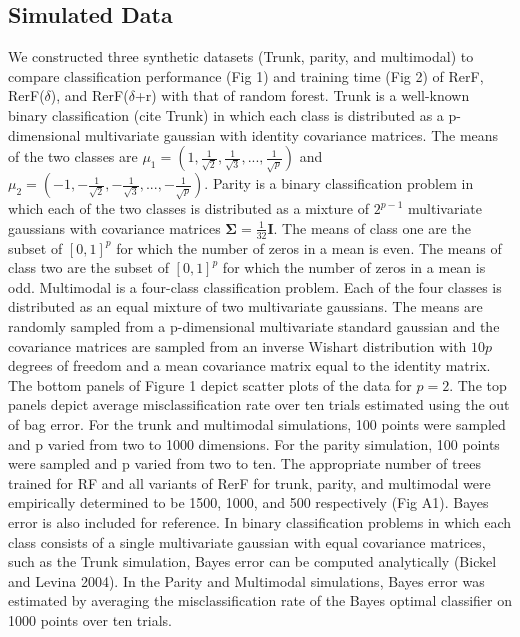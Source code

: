 \documentclass{article} %
\newcommand{\jovo}[1]{{\color{magenta}{\it jovo says: #1}}}
\begin{document}
\subsection{Simulated Data}
We constructed three synthetic datasets (Trunk, parity, and multimodal) to compare classification performance (Fig 1\jovo{use fig labels to refer to figs}) and training time (Fig 2) of RerF, RerF($\delta$), and RerF($\delta$+r) with that of random forest. Trunk is a well-known binary classification (cite Trunk) in which each class is distributed as a p-dimensional multivariate gaussian with identity covariance matrices. The means of the two classes are $\mu_1 = (1,\frac{1}{\sqrt{2}},\frac{1}{\sqrt{3}},...,\frac{1}{\sqrt{p}})$ and $\mu_2 = (-1,-\frac{1}{\sqrt{2}},-\frac{1}{\sqrt{3}},...,-\frac{1}{\sqrt{p}})$. Parity is a binary classification problem in which each of the two classes is distributed as a mixture of $2^{p-1}$ multivariate gaussians with covariance matrices $\boldsymbol{\Sigma} = \frac{1}{32}\boldsymbol{I}$. The means of class one are the subset of $[0,1]^p$ for which the number of zeros in a mean is even. The means of class two are the subset of $[0,1]^p$ for which the number of zeros in a mean is odd. Multimodal is a four-class classification problem. Each of the four classes is distributed as an equal mixture of two multivariate gaussians. The means are randomly sampled from a p-dimensional multivariate standard gaussian and the covariance matrices are sampled from an inverse Wishart distribution with $10p$ degrees of freedom and  a mean covariance matrix equal to the identity matrix. The bottom panels of Figure 1 depict scatter plots of the data for $p=2$. The top panels depict average misclassification rate over ten trials estimated using the out of bag error. For the trunk and multimodal simulations, 100 points were sampled and p varied from two to 1000 dimensions. For the parity simulation, 100 points were sampled and p varied from two to ten. The appropriate number of trees trained for RF and all variants of RerF for trunk, parity, and multimodal were empirically determined to be 1500, 1000, and 500 respectively (Fig A1). Bayes error is also included for reference. In binary classification problems in which each class consists of a single multivariate gaussian with equal covariance matrices, such as the Trunk simulation, Bayes error can be computed analytically (Bickel and Levina 2004). In the Parity and Multimodal simulations, Bayes error was estimated by averaging the misclassification rate of the Bayes optimal classifier on 1000 points over ten trials.
\end{document}
